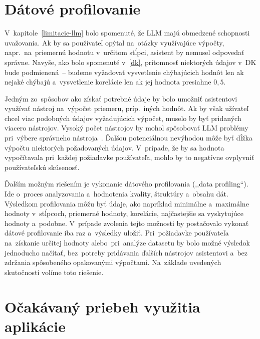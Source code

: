 \section{Dátové profilovanie}

V~kapitole~\ref{limitacie-llm} bolo spomenuté, že LLM majú obmedzené schopnosti uvažovania. Ak by sa používateľ opýtal na~otázky využívajúce výpočty, napr.~na~priemernú hodnotu v~určitom stĺpci, asistent by nemusel odpovedať správne. Navyše, ako bolo spomenuté v~\ref{dk}, prítomnosť niektorých údajov v~DK bude podmienená~-- budeme vyžadovať vysvetlenie chýbajúcich hodnôt len ak nejaké chýbajú a~vysvetlenie korelácie len ak jej hodnota presiahne $0,5$.

Jedným zo~spôsobov ako získať potrebné údaje by bolo umožniť asistentovi využívať nástroj na~výpočet priemeru, príp.~iných hodnôt. Ak by však užívateľ chcel viac podobných údajov vyžadujúcich výpočet, muselo by byť pridaných viacero nástrojov. Vysoký počet nástrojov by mohol spôsobovať LLM problémy pri~výbere správneho nástroja~\cite{too-many-tools}. Ďalšou potenciálnou nevýhodou môže byť dĺžka výpočtu niektorých požadovaných údajov. V~prípade, že by sa hodnota vypočítavala pri~každej požiadavke používateľa, mohlo by to negatívne ovplyvniť používateľskú skúsenosť.

Ďalším možným riešením je vykonanie dátového profilovania (,,data profiling``). Ide o~proces analyzovania a~hodnotenia kvality, štruktúry a~obsahu dát. Výsledkom profilovania môžu byť údaje, ako napríklad minimálne a~maximálne hodnoty v~stĺpcoch, priemerné hodnoty, korelácie, najčastejšie sa vyskytujúce hodnoty a~podobne. V~prípade zvolenia tejto možnosti by postačovalo vykonať dátové profilovanie iba raz a~výsledky uložiť. Pri~požiadavke používateľa na~získanie určitej hodnoty alebo~pri~analýze datasetu by bolo možné výsledok jednoducho načítať, bez~potreby pridávania ďalších nástrojov asistentovi a~bez zdržania spôsobeného opakovanými výpočtami. Na~základe uvedených skutočností volíme toto riešenie.

\section{Očakávaný priebeh využitia aplikácie}
\label{ocakavany-priebeh-vyuzitia-aplikacie}

